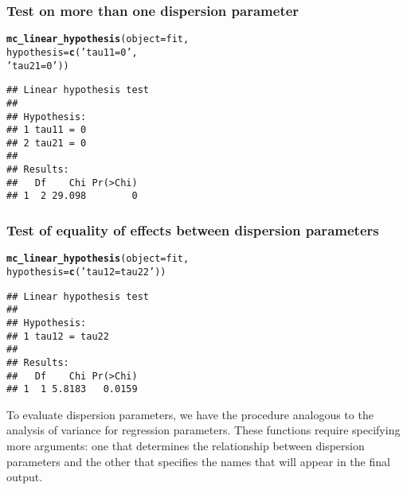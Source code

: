 \documentclass[article]{jss}\usepackage[]{graphicx}\usepackage[]{xcolor}
\makeatletter
\newcommand{\hlstr}[1]{\textcolor[rgb]{0.192,0.494,0.8}{#1}}%
\newcommand{\hlstd}[1]{\textcolor[rgb]{0.345,0.345,0.345}{#1}}%
\newcommand{\hlkwc}[1]{\textcolor[rgb]{0.333,0.667,0.333}{#1}}%
\newcommand{\hlkwd}[1]{\textcolor[rgb]{0.737,0.353,0.396}{\textbf{#1}}}%
\newenvironment{kframe}{%
 \def\at@end@of@kframe{}%
 \ifinner\ifhmode%
  \def\at@end@of@kframe{\end{minipage}}%
  \begin{minipage}{\columnwidth}%
 \fi\fi%
 \def\FrameCommand##1{\hskip\@totalleftmargin \hskip-\fboxsep
 \colorbox{shadecolor}{##1}\hskip-\fboxsep
     \hskip-\linewidth \hskip-\@totalleftmargin \hskip\columnwidth}%
 \MakeFramed {\advance\hsize-\width
   \@totalleftmargin\z@ \linewidth\hsize
   \@setminipage}}%
 {\par\unskip\endMakeFramed%
 \at@end@of@kframe}
\newenvironment{knitrout}{}{} %
\makeatother
\begin{document}
\subsubsection{Test on more than one dispersion parameter}

\begin{knitrout}
\color{fgcolor}\begin{kframe}
\begin{alltt}
\hlkwd{mc_linear_hypothesis}\hlstd{(}\hlkwc{object} \hlstd{=  fit,}
                     \hlkwc{hypothesis} \hlstd{=} \hlkwd{c}\hlstd{(}\hlstr{'tau11 = 0'}\hlstd{,}
                                    \hlstr{'tau21 = 0'}\hlstd{))}
\end{alltt}
\begin{verbatim}
## Linear hypothesis test
## 
## Hypothesis:           
## 1 tau11 = 0
## 2 tau21 = 0
## 
## Results:
##   Df    Chi Pr(>Chi)
## 1  2 29.098        0
\end{verbatim}
\end{kframe}
\end{knitrout}

\subsubsection{Test of equality of effects between dispersion parameters}

\begin{knitrout}
\color{fgcolor}\begin{kframe}
\begin{alltt}
\hlkwd{mc_linear_hypothesis}\hlstd{(}\hlkwc{object} \hlstd{=  fit,}
                     \hlkwc{hypothesis} \hlstd{=} \hlkwd{c}\hlstd{(}\hlstr{'tau12 = tau22'}\hlstd{))}
\end{alltt}
\begin{verbatim}
## Linear hypothesis test
## 
## Hypothesis:               
## 1 tau12 = tau22
## 
## Results:
##   Df    Chi Pr(>Chi)
## 1  1 5.8183   0.0159
\end{verbatim}
\end{kframe}
\end{knitrout}

To evaluate dispersion parameters, we have the procedure analogous to the analysis of variance for regression parameters. These functions require specifying more arguments: one that determines the relationship between dispersion parameters and the other that specifies the names that will appear in the final output.
\end{document}
